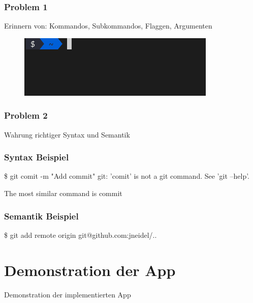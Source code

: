 \documentclass{beamer}
\begin{document}
\begin{frame}
  \frametitle{Problem 1}

  Erinnern von: Kommandos, Subkommandos, Flaggen, Argumenten

  \begin{figure}
    \centering
    \includegraphics[scale=0.5]{empty-prompt.png}
  \end{figure}
\end{frame}

\begin{frame}
  \frametitle{Problem 2}

  Wahrung richtiger Syntax und Semantik
\end{frame}

\begin{frame}[fragile]
  \frametitle{Syntax Beispiel}

  \begin{shellcode}
\$ git comit -m "Add commit"
git: 'comit' is not a git command. See 'git --help'.

The most similar command is
        commit
  \end{shellcode}
\end{frame}

\begin{frame}[fragile]
    \frametitle{Semantik Beispiel}

    \begin{shellcode}
  \$ git add remote origin git@github.com:jneidel/..
    \end{shellcode}
\end{frame}

\section{Demonstration der App}
\begin{frame}
  \begin{center}
    {\Huge Demonstration der implementierten App}
  \end{center}
\end{frame}
\end{document}
